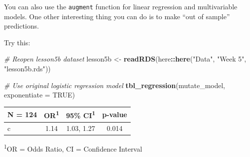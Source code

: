 \documentclass[]{book}
\newenvironment{Shaded}{\begin{snugshade}}{\end{snugshade}}
\newcommand{\CommentTok}[1]{\textcolor[rgb]{0.56,0.35,0.01}{\textit{#1}}}
\newcommand{\DataTypeTok}[1]{\textcolor[rgb]{0.13,0.29,0.53}{#1}}
\newcommand{\DecValTok}[1]{\textcolor[rgb]{0.00,0.00,0.81}{#1}}
\newcommand{\KeywordTok}[1]{\textcolor[rgb]{0.13,0.29,0.53}{\textbf{#1}}}
\newcommand{\NormalTok}[1]{#1}
\newcommand{\OperatorTok}[1]{\textcolor[rgb]{0.81,0.36,0.00}{\textbf{#1}}}
\newcommand{\OtherTok}[1]{\textcolor[rgb]{0.56,0.35,0.01}{#1}}
\newcommand{\StringTok}[1]{\textcolor[rgb]{0.31,0.60,0.02}{#1}}
\begin{document}
You can also use the \texttt{augment} function for linear regression and multivariable models. One other interesting thing you can do is to make ``out of sample'' predictions.

Try this:

\begin{Shaded}
\begin{Highlighting}[]
\CommentTok{# Reopen lesson5b dataset}
\NormalTok{lesson5b <-}\StringTok{ }\KeywordTok{readRDS}\NormalTok{(here}\OperatorTok{::}\KeywordTok{here}\NormalTok{(}\StringTok{"Data"}\NormalTok{, }\StringTok{"Week 5"}\NormalTok{, }\StringTok{"lesson5b.rds"}\NormalTok{))}

\CommentTok{# Use original logistic regression model}
\KeywordTok{tbl_regression}\NormalTok{(mutate_model, }\DataTypeTok{exponentiate =} \OtherTok{TRUE}\NormalTok{)}
\end{Highlighting}
\end{Shaded}

\captionsetup[table]{labelformat=empty,skip=1pt}
\begin{longtable}{lccc}
\toprule
\textbf{N = 124} & \textbf{OR}\textsuperscript{1} & \textbf{95\% CI}\textsuperscript{1} & \textbf{p-value} \\ 
\midrule
c & 1.14 & 1.03, 1.27 & 0.014 \\ 
\bottomrule
\end{longtable}
\vspace{-5mm}
\begin{minipage}{\linewidth}
\textsuperscript{1}OR = Odds Ratio, CI = Confidence Interval \\ 
\end{minipage}

\begin{Shaded}
\end{Shaded}
\end{document}
